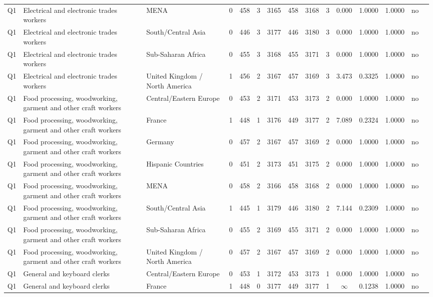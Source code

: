 \begin{longtable}{lllrcccccccccll}
Q1 & Electrical and electronic trades workers & MENA & 0 & 458 & 3 & 3165 & 458 & 3168 & 3 & 0.000 & 1.0000 & 1.0000 & no \\
Q1 & Electrical and electronic trades workers & South/Central Asia & 0 & 446 & 3 & 3177 & 446 & 3180 & 3 & 0.000 & 1.0000 & 1.0000 & no \\
Q1 & Electrical and electronic trades workers & Sub-Saharan Africa & 0 & 455 & 3 & 3168 & 455 & 3171 & 3 & 0.000 & 1.0000 & 1.0000 & no \\
Q1 & Electrical and electronic trades workers & United Kingdom / North America & 1 & 456 & 2 & 3167 & 457 & 3169 & 3 & 3.473 & 0.3325 & 1.0000 & no \\
Q1 & Food processing, woodworking, garment and other craft workers & Central/Eastern Europe & 0 & 453 & 2 & 3171 & 453 & 3173 & 2 & 0.000 & 1.0000 & 1.0000 & no \\
Q1 & Food processing, woodworking, garment and other craft workers & France & 1 & 448 & 1 & 3176 & 449 & 3177 & 2 & 7.089 & 0.2324 & 1.0000 & no \\
Q1 & Food processing, woodworking, garment and other craft workers & Germany & 0 & 457 & 2 & 3167 & 457 & 3169 & 2 & 0.000 & 1.0000 & 1.0000 & no \\
Q1 & Food processing, woodworking, garment and other craft workers & Hispanic Countries & 0 & 451 & 2 & 3173 & 451 & 3175 & 2 & 0.000 & 1.0000 & 1.0000 & no \\
Q1 & Food processing, woodworking, garment and other craft workers & MENA & 0 & 458 & 2 & 3166 & 458 & 3168 & 2 & 0.000 & 1.0000 & 1.0000 & no \\
Q1 & Food processing, woodworking, garment and other craft workers & South/Central Asia & 1 & 445 & 1 & 3179 & 446 & 3180 & 2 & 7.144 & 0.2309 & 1.0000 & no \\
Q1 & Food processing, woodworking, garment and other craft workers & Sub-Saharan Africa & 0 & 455 & 2 & 3169 & 455 & 3171 & 2 & 0.000 & 1.0000 & 1.0000 & no \\
Q1 & Food processing, woodworking, garment and other craft workers & United Kingdom / North America & 0 & 457 & 2 & 3167 & 457 & 3169 & 2 & 0.000 & 1.0000 & 1.0000 & no \\
Q1 & General and keyboard clerks & Central/Eastern Europe & 0 & 453 & 1 & 3172 & 453 & 3173 & 1 & 0.000 & 1.0000 & 1.0000 & no \\
Q1 & General and keyboard clerks & France & 1 & 448 & 0 & 3177 & 449 & 3177 & 1 & $\infty$ & 0.1238 & 1.0000 & no \\

\end{longtable}
